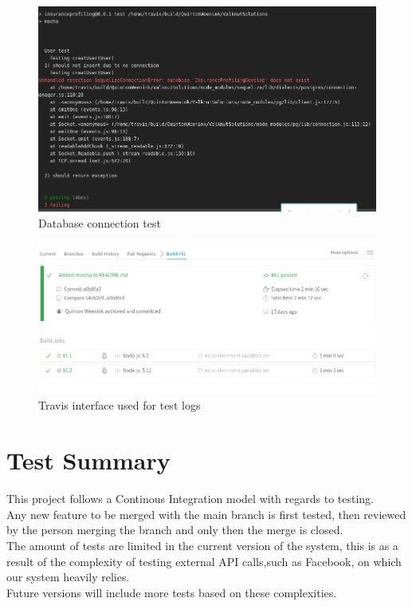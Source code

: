 \documentclass{article}
\begin{document}
\begin{itemize}
	\begin{figure}[h]
  	\centering
      \includegraphics[width=\textwidth]{images/DBConnectionFailed.png}
  	\caption{Database connection test}
  	\label{fig:DBFailed}
	\end{figure}	
	
	
	\begin{figure}[h]
  	\centering
      \includegraphics[width=\textwidth]{images/TravisInterface.png}
  	\caption{Travis interface used for test logs}
	\end{figure}

\end{itemize}

\cleardoublepage
\section{Test Summary}
This project follows a Continous Integration model with regards to testing. \\ Any new feature to be merged with the main branch is first tested, then reviewed by the person merging the branch and only then the merge is closed.\\
The amount of tests are limited in the current version of the system, this is as a result of the complexity of testing external API calls,such as Facebook, on which our system heavily relies.\\
Future versions will include more tests based on these complexities.
\end{document}
